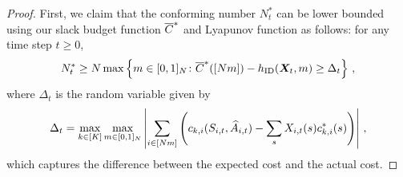 \begin{proof}
First, we claim that the conforming number $N_t^*$ can be lower bounded using our slack budget function $\overline{C}^*$ and Lyapunov function as follows: for any time step $t\geq 0$, 
\begin{align}\label{eq:nt eq1}
    N_t^* \geq N \max\left\{ m\in[0,1]_N\colon   \overline{C}^*([Nm])-h_{\textnormal{ID}}({\bm{X}}_t,m)\geq  \Delta_t \right\}\,,
\end{align}
where $\Delta_t$ is the random variable given by 
\begin{align}\label{eq:deltat}
    \Delta_t = \max_{k\in[K]} \max_{m\in[0,1]_N} \left\lvert\sum_{i\in[Nm]}\left(c_{k,i}(S_{i,t},\widehat{A}_{i,t})- \sum_{s}X_{i,t}(s)c_{k,i}^*(s)\right)\right\rvert\,,
\end{align}
which captures the difference between the expected cost and the actual cost.  


\end{proof}
